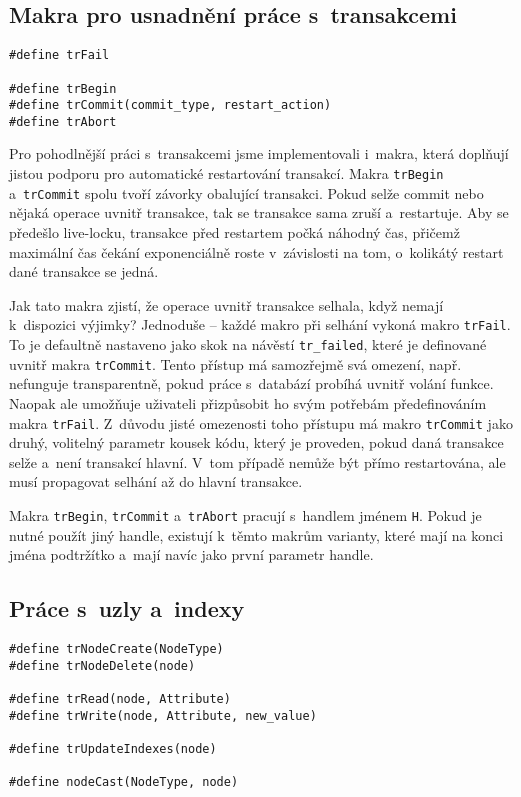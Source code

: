 \subsection{Makra pro usnadnění práce s~transakcemi}
\begin{verbatim}
#define trFail

#define trBegin
#define trCommit(commit_type, restart_action)
#define trAbort
\end{verbatim}

Pro pohodlnější práci s~transakcemi jsme implementovali i~makra, která doplňují jistou
podporu pro automatické restartování transakcí. Makra \verb|trBegin| a~\verb|trCommit|
spolu tvoří závorky obalující transakci. Pokud selže commit nebo nějaká operace uvnitř
transakce, tak se transakce sama zruší a~restartuje. Aby se předešlo live-locku,
transakce před restartem počká náhodný čas, přičemž maximální čas čekání exponenciálně
roste v~závislosti na tom, o~kolikátý restart dané transakce se jedná.

Jak tato makra zjistí, že operace uvnitř transakce selhala, když nemají k~dispozici
výjimky? Jednoduše -- každé makro při selhání vykoná makro \verb|trFail|. To je
defaultně nastaveno jako skok na návěstí \verb|tr_failed|, které je definované uvnitř
makra \verb|trCommit|. Tento přístup má samozřejmě svá omezení, např. nefunguje
transparentně, pokud práce s~databází probíhá uvnitř volání funkce. Naopak ale umožňuje
uživateli přizpůsobit ho svým potřebám předefinováním makra \verb|trFail|. Z~důvodu
jisté omezenosti toho přístupu má makro \verb|trCommit| jako druhý, volitelný parametr
kousek kódu, který je proveden, pokud daná transakce selže a~není transakcí hlavní.
V~tom případě nemůže být přímo restartována, ale musí propagovat selhání až do hlavní
transakce.

Makra \verb|trBegin|, \verb|trCommit| a~\verb|trAbort| pracují s~handlem jménem
\verb|H|. Pokud je nutné použít jiný handle, existují k~těmto makrům varianty,
které mají na konci jména podtržítko a~mají navíc jako první parametr handle.

\subsection{Práce s~uzly a~indexy}
\begin{verbatim}
#define trNodeCreate(NodeType)
#define trNodeDelete(node)

#define trRead(node, Attribute)
#define trWrite(node, Attribute, new_value)

#define trUpdateIndexes(node)

#define nodeCast(NodeType, node)
\end{verbatim}

